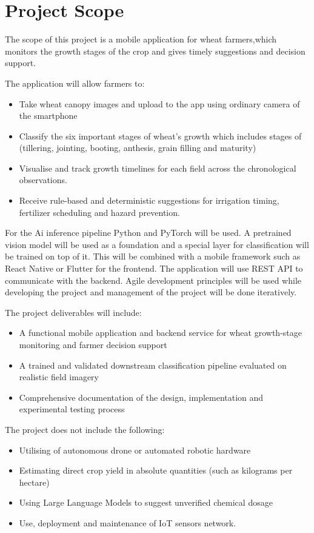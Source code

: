 \documentclass{FastFyp}
\begin{document}
\section{Project Scope}
The scope of this project is a mobile application for wheat farmers,which monitors the growth stages of the crop and gives timely suggestions and decision support. 

The application will allow farmers to:
\begin{itemize}
    \item Take wheat canopy images and upload to the app using ordinary camera of the smartphone
    \item Classify the six important stages of wheat's growth which includes stages of (tillering, jointing, booting, anthesis, grain filling and maturity)
    \item Visualise and track growth timelines for each field across the chronological observations.
    \item Receive rule-based and deterministic suggestions for irrigation timing, fertilizer scheduling and hazard prevention.
\end{itemize}
 For the Ai inference pipeline Python and PyTorch will be used. A pretrained vision model will be used as a foundation and a special layer for classification will be trained on top of it. This will be combined with a mobile framework such as React Native or Flutter for the frontend. The application will use REST API to communicate with the backend. Agile development principles will be used while developing the project and management of the project will be done iteratively.
 
 The project deliverables will include:

\begin{itemize}
    \item A functional mobile application and backend service for wheat growth-stage monitoring and farmer decision support
    \item A trained and validated downstream classification pipeline evaluated on realistic field imagery
    \item Comprehensive documentation of the design, implementation and experimental testing process
\end{itemize}

 The project does not include the following: 
 
\begin{itemize}
    \item Utilising of autonomous drone or automated robotic hardware
    \item Estimating direct crop yield in absolute quantities (such as kilograms per hectare)
    \item Using Large Language Models to suggest unverified chemical dosage
    \item Use, deployment and maintenance of IoT sensors network.
\end{itemize}
\end{document}
